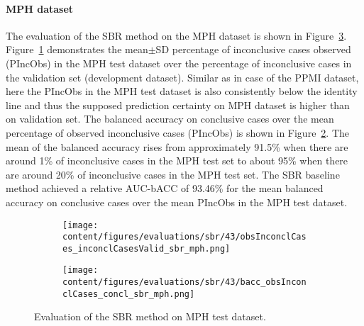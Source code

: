 
\paragraph{MPH dataset}

The evaluation of the SBR method on the MPH dataset is shown in Figure~\ref{fig:perf_results_sbr_mph}.
Figure~\ref{fig:obsInconclCases_inconclCasesValid_sbr_mph} demonstrates 
the mean$\pm$SD percentage of inconclusive cases observed (PIncObs) in the MPH test dataset 
over the percentage of inconclusive cases in the validation set (development dataset).
Similar as in case of the PPMI dataset, here the PIncObs in the MPH test dataset
is also consistently below the identity line 
and thus the supposed prediction certainty on MPH dataset is higher than on validation set.
The balanced accuracy on conclusive cases over the mean percentage of observed inconclusive cases (PIncObs) is shown 
in Figure~\ref{fig:bacc_obsInconclCases_concl_sbr_mph}.
The mean of the balanced accuracy rises from approximately 91.5\% 
when there are around 1\% of inconclusive cases in the MPH test set to about 95\% 
when there are around 20\% of inconclusive cases in the MPH test set.
The SBR baseline method achieved a relative AUC-bACC of 93.46\% for the mean balanced accuracy on conclusive cases 
over the mean PIncObs in the MPH test dataset.


\begin{figure}[ht]
  \begin{subfigure}{0.49\textwidth}
    \centering
    \texttt{[image: content/figures/evaluations/sbr/43/obsInconclCases\_inconclCasesValid\_sbr\_mph.png]}
    \label{fig:obsInconclCases_inconclCasesValid_sbr_mph}
  \end{subfigure}
  \hfill
  \begin{subfigure}{0.49\textwidth}
    \centering
    \texttt{[image: content/figures/evaluations/sbr/43/bacc\_obsInconclCases\_concl\_sbr\_mph.png]}
    \label{fig:bacc_obsInconclCases_concl_sbr_mph}
  \end{subfigure}
  \caption{Evaluation of the SBR method on MPH test dataset.}
  \label{fig:perf_results_sbr_mph}
\end{figure}

